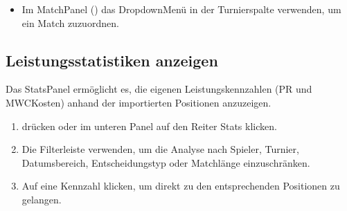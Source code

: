 \documentclass[letterpaper,10pt,german]{sphinxmanual}
\begin{document}
\sphinxAtStartPar
{}
\begin{itemize}
\item {} 
\sphinxAtStartPar
Im Match\sphinxhyphen{}Panel () das Dropdown\sphinxhyphen{}Menü in der Turnierspalte verwenden, um ein Match zuzuordnen.

\end{itemize}


\subsection{Leistungsstatistiken anzeigen}
\label{\detokenize{guide_utilisateur:afficher-les-statistiques-de-performance}}
\sphinxAtStartPar
Das Stats\sphinxhyphen{}Panel ermöglicht es, die eigenen Leistungskennzahlen (PR und MWC\sphinxhyphen{}Kosten) anhand der importierten Positionen anzuzeigen.
\begin{enumerate}
%
\item {} 
\sphinxAtStartPar
{} drücken oder im unteren Panel auf den Reiter Stats klicken.

\item {} 
\sphinxAtStartPar
Die Filterleiste verwenden, um die Analyse nach Spieler, Turnier, Datumsbereich, Entscheidungstyp oder Matchlänge einzuschränken.

\item {} 
\sphinxAtStartPar
Auf eine Kennzahl klicken, um direkt zu den entsprechenden Positionen zu gelangen.

\end{enumerate}
\end{document}
